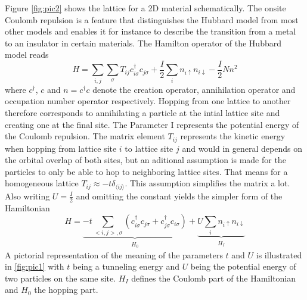 Figure \ref{fig:pic2} shows the lattice for a 2D material schematically. The onsite Coulomb repulsion is a feature that distinguishes the Hubbard model from most other models and enables it for instance to describe the transition from a metal to an insulator in certain materials. The Hamilton operator of the Hubbard model reads
\begin{equation}\label{Hubbard_original}
H = \sum_{i,j}\sum_{\sigma}T_{ij} c_{i\sigma}^\dag c_{j\sigma} + \frac{I}{2} \sum_{i}n_{i\uparrow}n_{i\downarrow} - \frac{I}{2}Nn^2
\end{equation}
where $ c^\dag $,  $ c $ and $ n = c^\dag c $ denote the creation operator, annihilation operator and occupation number operator respectively. Hopping from one lattice to another therefore corresponds to annihilating a particle at the intial lattice site and creating one at the final site. The Parameter I represents the potential energy of the Coulomb repulsion. The matrix element $ T_{ij} $ represents the kinetic energy when hopping from lattice site $i$ to lattice site $j$ and would in general depends on the orbital overlap of both sites, but an aditional assumption is made for the particles to only be able to hop to neighboring lattice sites.  That means for a homogeneous lattice $ T_{ij} \approx -t\delta_{\langle ij \rangle} $. This assumption simplifies the matrix a lot. Also writing  $ U = \frac{I}{2} $ and omitting the constant yields the simpler form of the Hamiltonian
\begin{equation}\label{Hubbard_standard}
H = \underbrace{-t\sum_{< i,j>,\sigma}\left( c_{i\sigma}^\dag c_{j\sigma} + c_{j\sigma}^\dag c_{i\sigma}\right)}_{\substack{H_0}}  + \underbrace{U \sum_{i}n_{i\uparrow}n_{i\downarrow}}_{\substack{H_I}}
\end{equation}
A pictorial representation of the meaning of the parameters $ t $ and $ U $ is illustrated in \ref{fig:pic1} with $t$ being a tunneling energy and $U$ being the potential energy of two particles on the same site. 
$ H_I $ defines the Coulomb part of the Hamiltonian and $H_0$ the hopping part.
